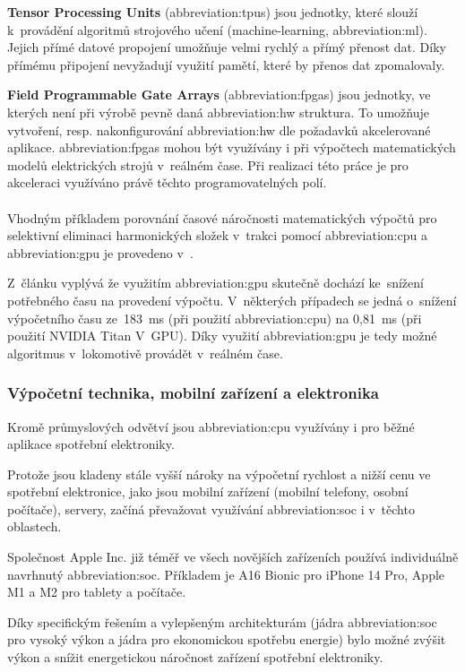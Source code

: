 \documentclass[a4paper, twoside, 11pt]{article}
\begin{document}
		\textbf{Tensor Processing Units} (\gls{abbreviation:tpus}) jsou jednotky, které slouží k~provádění algoritmů strojového učení (machine-learning, \gls{abbreviation:ml}). Jejich přímé datové propojení umožňuje velmi rychlý a přímý přenost dat. Díky přímému připojení nevyžadují využití pamětí, které by přenos dat zpomalovaly. \cite{xilinx-accelerated-computing}\par
		\textbf{Field Programmable Gate Arrays} (\gls{abbreviation:fpgas}) jsou jednotky, ve kterých není při výrobě pevně daná \gls{abbreviation:hw} struktura. To umožňuje vytvoření, resp. nakonfigurování \gls{abbreviation:hw} dle požadavků akcelerované aplikace. \gls{abbreviation:fpgas} mohou být využívány i při výpočtech matematických modelů elektrických strojů v~reálném čase. Při realizaci této práce je pro akceleraci využíváno právě těchto programovatelných polí.\\ \\
		\noindent Vhodným příkladem porovnání časové náročnosti matematických výpočtů pro selektivní eliminaci harmonických složek v~trakci pomocí \gls{abbreviation:cpu} a \gls{abbreviation:gpu} je provedeno v~\cite{ieee-selective-harmonic-elimination-nvidia}.\par
		Z~článku vyplývá že využitím \gls{abbreviation:gpu} skutečně dochází ke~snížení potřebného času na provedení výpočtu. V~některých případech se jedná o~snížení výpočetního času ze~183~ms (při použití \gls{abbreviation:cpu}) na 0,81~ms (při použití NVIDIA Titan V~GPU). Díky využití \gls{abbreviation:gpu} je tedy možné algoritmus v~lokomotivě provádět v~reálném čase.

	\subsubsection{Výpočetní technika, mobilní zařízení a elektronika}
	Kromě průmyslových odvětví jsou \gls{abbreviation:cpu} využívány i pro běžné aplikace spotřební elektroniky.\par
	Protože jsou kladeny stále vyšší nároky na výpočetní rychlost a nižší cenu ve spotřební elektronice, jako jsou mobilní zařízení (mobilní telefony, osobní počítače), servery, začíná převažovat využívání \gls{abbreviation:soc} i v~těchto oblastech.\par
	Společnost Apple Inc. již téměř ve všech novějších zařízeních používá individuálně navrhnutý \gls{abbreviation:soc}.
	Příkladem je A16 Bionic pro iPhone 14 Pro, Apple M1 a M2 pro tablety a počítače.\par
	Díky specifickým řešením a vylepšeným architekturám (jádra \gls{abbreviation:soc} pro vysoký výkon a jádra pro ekonomickou spotřebu energie) bylo možné zvýšit výkon a snížit energetickou náročnost zařízení spotřební elektroniky. \cite{apple-explore-the-new-architecture-of-apple-silicon-macs}
\end{document}
